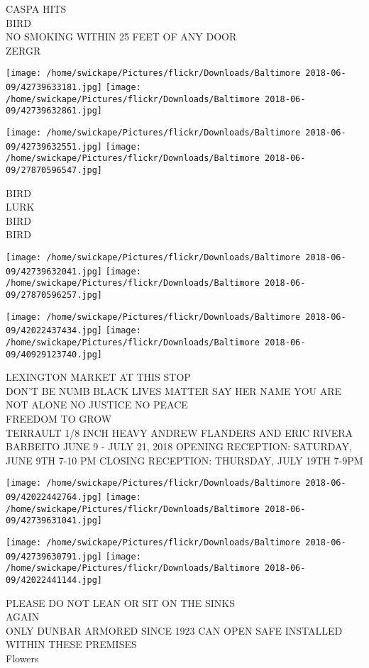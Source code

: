 \documentclass[10pt,letterpaper]{article}
\begin{document}
CASPA HITS\\
BIRD\\
NO SMOKING WITHIN 25 FEET OF ANY DOOR\\
ZERGR
\pagebreak

\texttt{[image: /home/swickape/Pictures/flickr/Downloads/Baltimore 2018-06-09/42739633181.jpg]}
\texttt{[image: /home/swickape/Pictures/flickr/Downloads/Baltimore 2018-06-09/42739632861.jpg]}

\texttt{[image: /home/swickape/Pictures/flickr/Downloads/Baltimore 2018-06-09/42739632551.jpg]}
\texttt{[image: /home/swickape/Pictures/flickr/Downloads/Baltimore 2018-06-09/27870596547.jpg]}

BIRD\\
LURK\\
BIRD\\
BIRD
\pagebreak

\texttt{[image: /home/swickape/Pictures/flickr/Downloads/Baltimore 2018-06-09/42739632041.jpg]}
\texttt{[image: /home/swickape/Pictures/flickr/Downloads/Baltimore 2018-06-09/27870596257.jpg]}

\texttt{[image: /home/swickape/Pictures/flickr/Downloads/Baltimore 2018-06-09/42022437434.jpg]}
\texttt{[image: /home/swickape/Pictures/flickr/Downloads/Baltimore 2018-06-09/40929123740.jpg]}

LEXINGTON MARKET AT THIS STOP\\
DON'T BE NUMB BLACK LIVES MATTER SAY HER NAME YOU ARE NOT ALONE NO JUSTICE NO PEACE\\
FREEDOM TO GROW\\
TERRAULT 1/8 INCH HEAVY ANDREW FLANDERS AND ERIC RIVERA BARBEITO JUNE 9 {-} JULY 21, 2018 OPENING RECEPTION: SATURDAY, JUNE 9TH 7{-}10 PM CLOSING RECEPTION: THURSDAY, JULY 19TH 7{-}9PM
\pagebreak

\texttt{[image: /home/swickape/Pictures/flickr/Downloads/Baltimore 2018-06-09/42022442764.jpg]}
\texttt{[image: /home/swickape/Pictures/flickr/Downloads/Baltimore 2018-06-09/42739631041.jpg]}

\texttt{[image: /home/swickape/Pictures/flickr/Downloads/Baltimore 2018-06-09/42739630791.jpg]}
\texttt{[image: /home/swickape/Pictures/flickr/Downloads/Baltimore 2018-06-09/42022441144.jpg]}

PLEASE DO NOT LEAN OR SIT ON THE SINKS\\
AGAIN\\
ONLY DUNBAR ARMORED SINCE 1923 CAN OPEN SAFE INSTALLED WITHIN THESE PREMISES\\
Flowers
\pagebreak
\end{document}
